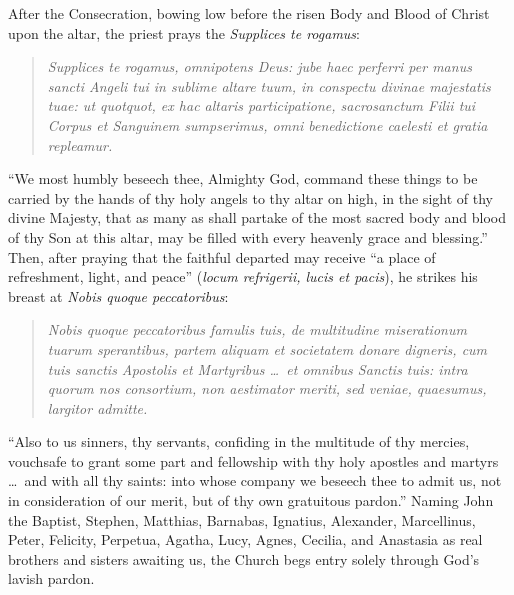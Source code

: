 After the Consecration, bowing low before the risen Body and Blood of Christ upon the altar, the priest prays the \textit{Supplices te rogamus}:

\begin{quote}
\textit{Supplices te rogamus, omnipotens Deus: jube haec perferri per manus sancti Angeli tui in sublime altare tuum, in conspectu divinae majestatis tuae: ut quotquot, ex hac altaris participatione, sacrosanctum Filii tui Corpus et Sanguinem sumpserimus, omni benedictione caelesti et gratia repleamur.}
\end{quote}

``We most humbly beseech thee, Almighty God, command these things to be carried by the hands of thy holy angels to thy altar on high, in the sight of thy divine Majesty, that as many as shall partake of the most sacred body and blood of thy Son at this altar, may be filled with every heavenly grace and blessing.'' Then, after praying that the faithful departed may receive ``a place of refreshment, light, and peace'' (\textit{locum refrigerii, lucis et pacis}), he strikes his breast at \textit{Nobis quoque peccatoribus}:

\begin{quote}
\textit{Nobis quoque peccatoribus famulis tuis, de multitudine miserationum tuarum sperantibus, partem aliquam et societatem donare digneris, cum tuis sanctis Apostolis et Martyribus \dots\ et omnibus Sanctis tuis: intra quorum nos consortium, non aestimator meriti, sed veniae, quaesumus, largitor admitte.}
\end{quote}

``Also to us sinners, thy servants, confiding in the multitude of thy mercies, vouchsafe to grant some part and fellowship with thy holy apostles and martyrs \dots\ and with all thy saints: into whose company we beseech thee to admit us, not in consideration of our merit, but of thy own gratuitous pardon.'' Naming John the Baptist, Stephen, Matthias, Barnabas, Ignatius, Alexander, Marcellinus, Peter, Felicity, Perpetua, Agatha, Lucy, Agnes, Cecilia, and Anastasia as real brothers and sisters awaiting us, the Church begs entry solely through God's lavish pardon.

